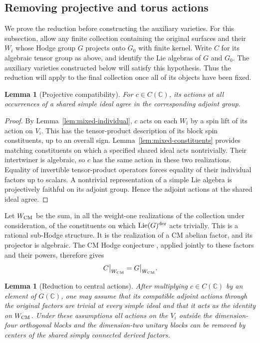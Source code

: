 \documentclass[11pt]{article}
\numberwithin{equation}{section}
\newtheorem{lemma}[theorem]{Lemma}
\theoremstyle{definition}
\theoremstyle{remark}
\begin{document}
\subsection{Removing projective and torus actions}

We prove the reduction before constructing the auxiliary varieties.
For this subsection, allow any finite collection containing the original
surfaces and their $W_i$ whose Hodge group $G$ projects onto $G_0$ with
finite kernel.  Write $C$ for its algebraic tensor group as above, and
identify the Lie algebras of $G$ and $G_0$.  The auxiliary varieties
constructed below will satisfy this hypothesis.  Thus the reduction
will apply to the final collection once all of its objects have been
fixed.

\begin{lemma}[Projective compatibility]\label{lem:mixed-projective}
For $c\in C(\mathbb C)$, its actions at all occurrences of a shared simple
ideal agree in the corresponding adjoint group.
\end{lemma}

\begin{proof}
By Lemma~\ref{lem:mixed-individual}, $c$ acts on each $W_i$ by a
spin lift of its action on $V_i$.  This has the tensor-product
description of its block spin constituents, up to an overall sign.
Lemma~\ref{lem:mixed-constituents} provides matching constituents
on which a specified shared ideal acts nontrivially.  Their
intertwiner is algebraic, so $c$ has the same action in these two
realizations.  Equality of invertible tensor-product operators
forces equality of their individual factors up to scalars.  A
nontrivial representation of a simple Lie algebra is projectively
faithful on its adjoint group.  Hence the adjoint actions at the
shared ideal agree.
\end{proof}

Let $W_{\rm CM}$ be the sum, in all the weight-one realizations of
the collection under consideration, of the constituents on which
$\operatorname{Lie}(G)^{\rm der}$ acts trivially.  This is a
rational sub-Hodge structure.  It is the realization of a CM abelian
factor, and its projector is algebraic.  The CM Hodge conjecture
\cite[Theorem~1.1]{CM}, applied jointly to these factors and their
powers, therefore gives
\begin{equation}\label{eq:mixed-cm-image}
 C\big|_{W_{\rm CM}}=G\big|_{W_{\rm CM}}.
\end{equation}

\begin{lemma}[Reduction to central actions]\label{lem:mixed-central}
After multiplying $c\in C(\mathbb C)$ by an element of $G(\mathbb C)$, one may
assume that its compatible adjoint actions through the original
factors are trivial at every simple ideal and that it acts as the
identity on $W_{\rm CM}$.  Under these assumptions all
actions on the $V_i$ outside the dimension-four orthogonal blocks
and the dimension-two unitary blocks can be removed by centers of
the shared simply connected derived factors.
\end{lemma}
\end{document}
